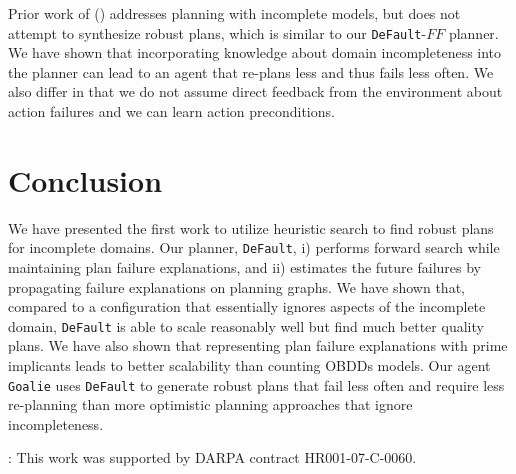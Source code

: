 \documentclass[letterpaper]{article}
\def\und#1{\noindent{\bf #1}:}
\def\default{{\tt DeFault}}
\def\goalie{{\tt Goalie}}
\def\citet#1{\citeauthor{#1} (\citeyear{#1})}
\begin{document}
Prior work of \citet{DBLP:conf/aips/ChangA06} addresses planning with incomplete
models, but does not attempt to synthesize robust plans, which is similar to our
\default{}-$FF$ planner.  We have shown that incorporating knowledge about
domain incompleteness into the planner can lead to an agent that re-plans less
and thus fails less often. We also differ in that we do not assume direct
feedback from the environment about action failures and we can learn action preconditions.

\section{Conclusion}

We have presented the first work to utilize heuristic search to find robust
plans for incomplete domains.  Our planner, \default{}, i) performs
forward search while maintaining plan failure explanations, and ii) estimates
the future failures by propagating failure explanations on planning graphs.  We
have shown that, compared to a configuration that essentially ignores aspects of
the incomplete domain, \default{} is able to scale reasonably well but find much
better quality plans.  We have also shown that representing plan failure
explanations with prime implicants leads to better scalability than counting
OBDDs models.  Our agent \goalie{} uses \default{} to generate robust plans that
fail less often and require less re-planning than more optimistic planning
approaches that ignore  incompleteness.

\smallskip

\und{Acknowledgements} This work was supported by DARPA contract HR001-07-C-0060.



 
\end{document}
